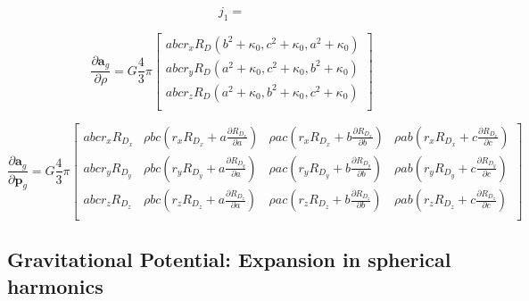 \begin{equation}
    j_1=
\end{equation}

\begin{equation}
    \frac{\partial{\bm{a}}_g}{\partial{\rho}} = 
    G\frac{4}{3}\pi
    \begin{bmatrix}
    {abc}{r_x}{R_D(b^2 + \kappa_0, c^2 + \kappa_0, a^2 + \kappa_0)}\\
    {abc}{r_y}{R_D(a^2 + \kappa_0, c^2 + \kappa_0, b^2 + \kappa_0)}\\
    {abc}{r_z}{R_D(a^2 + \kappa_0, b^2 + \kappa_0, c^2 + \kappa_0)}\\
    \end{bmatrix}
\end{equation}

\begin{equation}
    \frac{\partial{\bm{a}}_g}{\partial{\mathbf{p}_g}} = 
    G\frac{4}{3}\pi
    \begin{bmatrix}
    {abc}{r_x}{R_{D_x}} & \rho bc({r_x}{R_{D_x}} + a\frac{\partial{R_{D_x}}}{\partial{a}}) & \rho ac({r_x}{R_{D_x}} + b\frac{\partial{R_{D_x}}}{\partial{b}}) & \rho ab({r_x}{R_{D_x}} + c\frac{\partial{R_{D_x}}}{\partial{c}})\\
    {abc}{r_y}{R_{D_y}} & \rho bc({r_y}{R_{D_y}} + a\frac{\partial{R_{D_y}}}{\partial{a}}) & \rho ac({r_y}{R_{D_y}} + b\frac{\partial{R_{D_y}}}{\partial{b}}) & \rho ab({r_y}{R_{D_y}} + c\frac{\partial{R_{D_y}}}{\partial{c}})\\
    {abc}{r_z}{R_{D_z}} & \rho bc({r_z}{R_{D_z}} + a\frac{\partial{R_{D_z}}}{\partial{a}}) & \rho ac({r_z}{R_{D_z}} + b\frac{\partial{R_{D_z}}}{\partial{b}}) & \rho ab({r_z}{R_{D_z}} + c\frac{\partial{R_{D_z}}}{\partial{c}})\\
    \end{bmatrix}
\end{equation}

\subsection{Gravitational Potential: Expansion in spherical harmonics}
